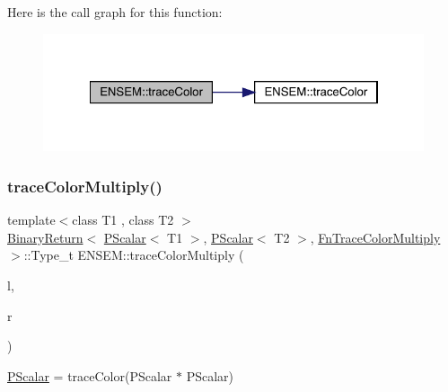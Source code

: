 Here is the call graph for this function\+:\nopagebreak
\begin{figure}[H]
\begin{center}
\leavevmode
\includegraphics[width=322pt]{db/dcc/group__primscalar_gaf9f8817942b8ea7583ac7146ede1508f_cgraph}
\end{center}
\end{figure}
\mbox{\label{group__primscalar_ga7d0ad8d52e28a6e277de161b427932eb}} 
\subsubsection{\texorpdfstring{traceColorMultiply()}{traceColorMultiply()}}
{\footnotesize\ttfamily template$<$class T1 , class T2 $>$ \\
\mbox{\hyperlink{structENSEM_1_1BinaryReturn}{Binary\+Return}}$<$ \mbox{\hyperlink{classENSEM_1_1PScalar}{P\+Scalar}}$<$ T1 $>$, \mbox{\hyperlink{classENSEM_1_1PScalar}{P\+Scalar}}$<$ T2 $>$, \mbox{\hyperlink{structENSEM_1_1FnTraceColorMultiply}{Fn\+Trace\+Color\+Multiply}} $>$\+::Type\+\_\+t E\+N\+S\+E\+M\+::trace\+Color\+Multiply (\begin{DoxyParamCaption}\item[{const \mbox{\hyperlink{classENSEM_1_1PScalar}{P\+Scalar}}$<$ T1 $>$ \&}]{l,  }\item[{const \mbox{\hyperlink{classENSEM_1_1PScalar}{P\+Scalar}}$<$ T2 $>$ \&}]{r }\end{DoxyParamCaption})\hspace{0.3cm}{\ttfamily [inline]}}



\mbox{\hyperlink{classENSEM_1_1PScalar}{P\+Scalar}} = trace\+Color(\+P\+Scalar $\ast$ P\+Scalar) 

